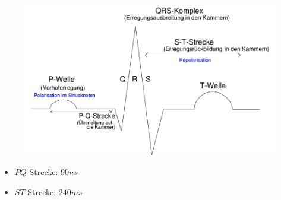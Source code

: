 \begin{frame}
\framesubtitle{}
    \begin{figure}[H]
    \begin{center}
            \includegraphics[scale=0.3]{./img/schaltung/wellen.png}
    \end{center}
    \end{figure}
    \begin{block}{}
         \begin{itemize}
             \item $PQ$-Strecke: $90ns$
             \item $ST$-Strecke: $240ms$
         \end{itemize}
    \end{block}
\end{frame}
